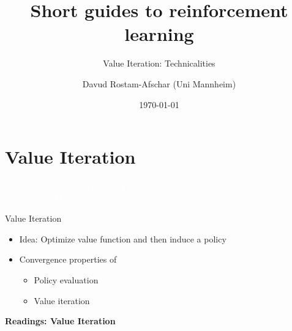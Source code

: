 \documentclass[11pt,table]{beamer}
\title[]{Short guides to reinforcement learning}
\subtitle[]{Value Iteration: Technicalities}
\author[D. Rostam-Afschar]{\textcolor{gray1}{Davud Rostam-Afschar (Uni Mannheim)}}
\date[]{\today}
\begin{document}
\begin{frame}[plain]
  \titlepage
\end{frame}



\section{Value Iteration}

{
\begin{frame}
\centering
\Huge
\textcolor{white}{Solving for state-value functions\\ in a system of linear equations}
\thispagestyle{empty}
\end{frame}
}



\begin{frame}{Value Iteration}

\begin{itemize}
\item Idea: Optimize value function and then induce a policy

 \item Convergence properties of

\begin{itemize}
\item Policy evaluation
\item Value iteration
\end{itemize}
\end{itemize}
\vspace{5mm}


\footnotesize
\textbf{Readings: Value Iteration}\\
\citet[][sections 4.1, 4.4]{sutton2018reinforcement}

\citet[][sections 2.2, 2.3]{szepesvari2022algorithms}

\citet[][sections 6.1-6.3]{puterman2014markov}

\citet[][chapter 1]{sigaud2013markov}


    
\end{frame}
\end{document}
